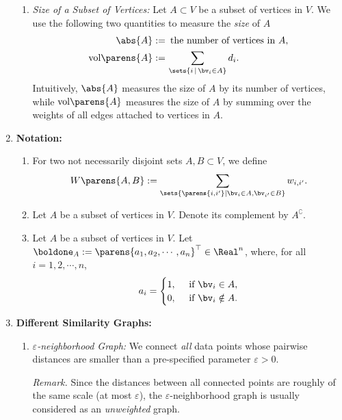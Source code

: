 \documentclass[12pt]{article}
\begin{document}
\begin{enumerate}[label=\textbf{\arabic*.}]
\begin{enumerate}
		\item \textit{Size of a Subset of Vertices:} Let $A \subset V$ be a subset of vertices in $V$. We use the following two quantities to measure the \emph{size} of $A$ 
		\begin{align*}
			\abs{A} := & \, \text{ the number of vertices in $A$}, \\ 
			\mathrm{vol} \parens{A} := & \, \sum_{\sets{i \,\vert\, \bv_i \in A}} d_i. 
		\end{align*}
		Intuitively, $\abs{A}$ measures the size of $A$ by its number of vertices, while $\mathrm{vol} \parens{A}$ measures the size of $A$ by summing over the weights of all edges attached to vertices in $A$. 
		
	\end{enumerate}
	
	\item \textbf{Notation:}
	\begin{enumerate}
		\item For two not necessarily disjoint sets $A, B \subset V$, we define 
		\begin{align*}
			W \parens{A, B} := \sum_{\sets{\parens{i,i'} \vert \bv_i \in A, \bv_{i'} \in B}} w_{i, i'}. 
		\end{align*}
		
		\item Let $A$ be a subset of vertices in $V$. Denote its complement by $A^{\complement}$. 
		
		\item Let $A$ be a subset of vertices in $V$. Let $\boldone_A := \parens{a_1, a_2, \cdots, a_n}^\top \in \Real^n$, where, for all $i = 1, 2, \cdots, n$, 
		\begin{align*}
			a_i = \begin{cases}
				1, & \, \text{ if } \bv_i \in A, \\ 
				0, & \, \text{ if } \bv_i \notin A. 
			\end{cases}
		\end{align*}
	\end{enumerate}
	
	\item \textbf{Different Similarity Graphs:} 
	\begin{enumerate}
		\item \textit{$\varepsilon$-neighborhood Graph:} We connect \emph{all} data points whose pairwise distances are smaller than a pre-specified parameter $\varepsilon > 0$. 
		
		\textit{Remark.} Since the distances between all connected points are roughly of the same scale (at most $\varepsilon$), the $\varepsilon$-neighborhood graph is usually considered as an \emph{unweighted} graph. 
		

\end{enumerate}
\end{enumerate}
\end{document}
